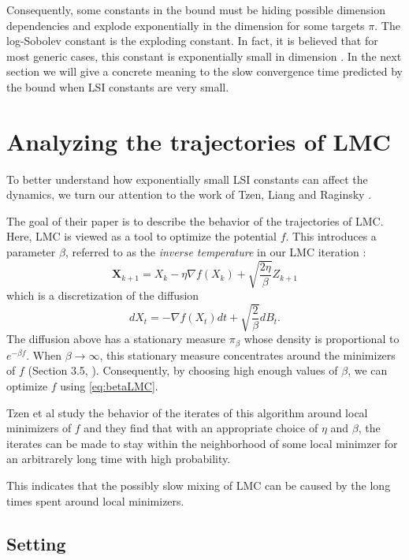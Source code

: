 \documentclass[11pt,twoside]{article}
\theoremstyle{definition}
\begin{document}
Consequently, some constants in the bound must be hiding possible dimension dependencies and explode exponentially in the dimension for some targets $\pi$. The log-Sobolev constant is the exploding constant. In fact, it is believed that for most generic cases, this constant is exponentially small in dimension \cite{raginsky_non-convex_2017}. In the next section we will give a concrete meaning to the slow convergence time predicted by the bound when LSI constants are very small.

\section{Analyzing the trajectories of LMC}

To better understand how exponentially small LSI constants can affect the dynamics, we turn our attention to the work of Tzen, Liang and Raginsky \cite{tzen_local_2018}. 

The goal of their paper is to describe the behavior of the trajectories of LMC. Here, LMC is viewed as a tool to optimize the potential $f$. This introduces a parameter $\beta$, referred to as the \textit{inverse temperature} in our LMC iteration :
\begin{equation}
\label{eq:betaLMC}
\mathbf{X}_{k+1} = X_k - \eta \nabla f(X_k) + \sqrt{\frac{2\eta}{\beta}}Z_{k+1}
\tag{LMC-$\beta$}
\end{equation}
which is a discretization of the diffusion
\begin{equation}
\label{eq:betadiff}
\tag{LD-$\beta$}
dX_t = -\nabla f(X_t)dt + \sqrt{\frac{2}{\beta}}dB_t.
\end{equation}
The diffusion above has a stationary measure $\pi_\beta$ whose density is proportional to $e^{-\beta f}$. When $\beta \rightarrow \infty$, this stationary measure concentrates around the minimizers of $f$ (Section 3.5, \cite{raginsky_non-convex_2017}). Consequently, by choosing high enough values of $\beta$, we can optimize $f$ using \eqref{eq:betaLMC}.

Tzen et al study the behavior of the iterates of this algorithm around local minimizers of $f$ and they find that with an appropriate choice of $\eta$ and $\beta$, the iterates can be made to stay within the neighborhood of some local minimzer for an arbitrarely long time with high probability.

This indicates that the possibly slow mixing of LMC can be caused by the long times spent around local minimizers.


\subsection{Setting}
\end{document}

